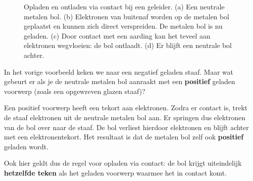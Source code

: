 \documentclass{ximera}
\begin{document}
\begin{figure}[ht!]
\begin{center}
    \end{center}
    \caption{Opladen en ontladen via contact bij een geleider. (a) Een neutrale metalen bol. (b) Elektronen van buitenaf worden op de metalen bol geplaatst en kunnen zich direct verspreiden. De metalen bol is nu geladen. (c) Door contact met een aarding kan het teveel aan elektronen wegvloeien: de bol ontlaadt. (d) Er blijft een neutrale bol achter.}
    \label{fig:opladen_ontladen_geleider}
\end{figure}

\begin{remark}[expandable=true,title={Opladen met een positief voorwerp}]\nl
    In het vorige voorbeeld keken we naar een negatief geladen staaf. Maar wat gebeurt er als je de neutrale metalen bol aanraakt met een \textbf{positief} geladen voorwerp (zoals een opgewreven glazen staaf)?
    
    Een positief voorwerp heeft een tekort aan elektronen. Zodra er contact is, trekt de staaf elektronen uit de neutrale metalen bol aan. Er springen dus elektronen van de bol over naar de staaf. De bol verliest hierdoor elektronen en blijft achter met een elektronentekort. Het resultaat is dat de metalen bol zelf ook \textbf{positief} geladen wordt.
    
    Ook hier geldt dus de regel voor opladen via contact: de bol krijgt uiteindelijk \textbf{hetzelfde teken} als het geladen voorwerp waarmee het in contact komt.
\end{remark}
\end{document}
